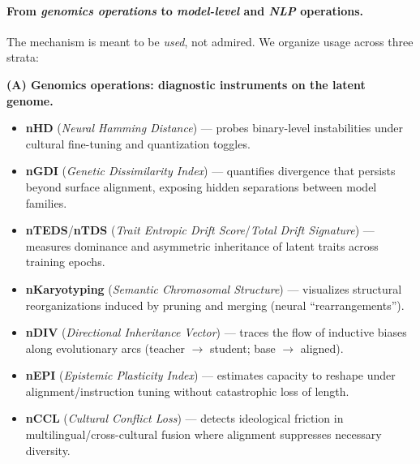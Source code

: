 \documentclass[11pt]{article}
\begin{document}
\paragraph{From \emph{genomics operations} to \emph{model-level} and \emph{NLP} operations.}
The mechanism is meant to be \emph{used}, not admired. We organize usage across three strata:

\medskip
\noindent\textbf{(A) Genomics operations: diagnostic instruments on the latent genome.}
\begin{itemize}
  \item \textbf{nHD} (\emph{Neural Hamming Distance}) --- probes binary-level instabilities under cultural fine-tuning and quantization toggles.
  \item \textbf{nGDI} (\emph{Genetic Dissimilarity Index}) --- quantifies divergence that persists beyond surface alignment, exposing hidden separations between model families.
  \item \textbf{nTEDS}/\textbf{nTDS} (\emph{Trait Entropic Drift Score}/\emph{Total Drift Signature}) --- measures dominance and asymmetric inheritance of latent traits across training epochs.
  \item \textbf{nKaryotyping} (\emph{Semantic Chromosomal Structure}) --- visualizes structural reorganizations induced by pruning and merging (neural “rearrangements”).
  \item \textbf{nDIV} (\emph{Directional Inheritance Vector}) --- traces the flow of inductive biases along evolutionary arcs (teacher $\rightarrow$ student; base $\rightarrow$ aligned).
  \item \textbf{nEPI} (\emph{Epistemic Plasticity Index}) --- estimates capacity to reshape under alignment/instruction tuning without catastrophic loss of length.
  \item \textbf{nCCL} (\emph{Cultural Conflict Loss}) --- detects ideological friction in multilingual/cross-cultural fusion where alignment suppresses necessary diversity.
\end{itemize}
\end{document}
